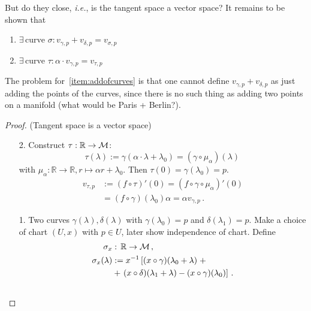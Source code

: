 \documentclass[11pt, a4paper, twocolumn]{article} %
\begin{document}
But do they close, \textit{i.e.}, is the tangent space a vector space?
It remains to be shown that
\begin{enumerate}
    \item $\exists\, \text{curve }\sigma: v_{\gamma, p} + v_{\delta, p} = v_{\sigma, p}$
        \label{item:addofcurves}
    \item $\exists\, \text{curve }\tau: \alpha\cdot v_{\gamma,p} = v_{\tau, p}$
\end{enumerate}
The problem for~\ref{item:addofcurves} is that one cannot define $v_{\gamma,p} + v_{\delta, p}$
as just adding the points of the curves, since there is no such thing as adding two points on 
a manifold (what would be Paris + Berlin?).\\
\begin{proof} (Tangent space is a vector space)\\
    \begin{itemize}
        \item[2.]
            Construct $\tau: \mathbb{R} \to \mathcal{M}$:
            \begin{equation}
                \tau(\lambda) := \gamma(\alpha\cdot\lambda + \lambda_0) = (\gamma\circ\mu_\alpha)(\lambda)\,
            \end{equation}
            with $\mu_\alpha: \mathbb{R}\to\mathbb{R}, r\mapsto \alpha r + \lambda_0$.
            Then $\tau(0) = \gamma(\lambda_0) = p$.
            \begin{align}
                v_{\tau, p} &:= (f\circ\tau)'(0) = (f\circ\gamma\circ\mu_\alpha)'(0)\nonumber\\
                &= (f\circ\gamma)(\lambda_0)\alpha = \alpha v_{\gamma,p}\,.
            \end{align}
        \item [1.] Two curves $\gamma(\lambda), \delta(\lambda)$ with $\gamma(\lambda_0) = p$ and
            $\delta(\lambda_1) = p$. 
            Make a choice of chart $(U, x)$ with $p\in U$, later show independence of chart.
            Define
            \begin{align}
                \sigma_x&:\,\mathbb{R}\to\mathcal{M}\,,\nonumber \\
            \sigma_x(\lambda)&:= x^{-1} \left[ (x\circ\gamma)(\lambda_0 + \lambda)\right. +\\
            &+ \left.(x\circ\delta)(\lambda_1+\lambda) - (x\circ\gamma)(\lambda_0)\right]\,.\nonumber
            \end{align}
            \begin{align}

\end{align}
\end{itemize}
\end{proof}
\end{document}
